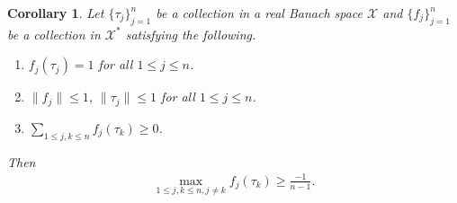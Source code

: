 \documentclass{amsart}
\newtheorem{corollary}[theorem] {Corollary}
\begin{document}
\begin{corollary}
Let $\{\tau_j\}_{j=1}^n$ be  a collection in a real Banach space $\mathcal{X}$	and $\{f_j\}_{j=1}^n$ be  a collection in $\mathcal{X}^*$ satisfying the following. 
\begin{enumerate}[\upshape(i)]
	\item $f_j(\tau_j)=1$ for all $1 \leq j \leq n$.
	\item  $\|f_j\|\leq 1$, $\|\tau_j\|\leq 1$ for all $1 \leq j \leq n$.
	\item $\sum_{1\leq j, k \leq n}f_j(\tau_k)\geq 0$. 
\end{enumerate}
Then 
\begin{align*}
		\max _{1\leq j,k \leq n, j\neq k}f_j(\tau_k) \geq\frac{-1}{n-1}.
\end{align*}
\end{corollary}



 
 
 
\end{document}
